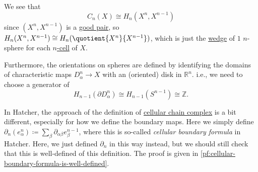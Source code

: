 \begin{remark}
	We see that
	\[
		C_{n} (X) \cong H_{n} (X^n, X^{n-1})
	\]
	since \((X^n, X^{n-1})\) is a \hyperref[def:good-pair]{good pair}, so \(H_{n} (X^n, X^{n-1}) \cong H_n(\quotient{X^n}{X^{n-1}})\), which is
	just the \hyperref[CW-complex-wedge-sum]{wedge} of \(1\) \(n\)-sphere for each \hyperref[def:cell]{\(n\)-cell} of \(X\).

	Furthermore, the orientations on spheres are defined by identifying the domains of characteristic maps 	\(D^n_\alpha \to X\) with an (oriented) disk in
	\(\mathbb{R} ^n\). i.e., we need to choose a generator of
	\[
		H_{n-1}(\partial D^n_\alpha) \cong H_{n-1}(S^{n-1})\cong \mathbb{Z}.
	\]
\end{remark}
\begin{note}
	In Hatcher\cite{hatcher2002algebraic}, the approach of the definition of \hyperref[def:cellular-chain-complex]{cellular chain complex} is
	a bit different, especially for how we define the boundary maps. Here we simply define \(\partial _n(e^n_\alpha ) \coloneqq \sum_\beta \partial _{\alpha \beta }e^{n-1}_\beta\),
	where this is so-called \emph{cellular boundary formula} in Hatcher\cite{hatcher2002algebraic}. Here, we just defined \(\partial _n\) in this way instead, but
	we should still check that this is well-defined of this definition. The proof is given in \autoref{pf:cellular-boundary-formula-is-well-defined}.
\end{note}

